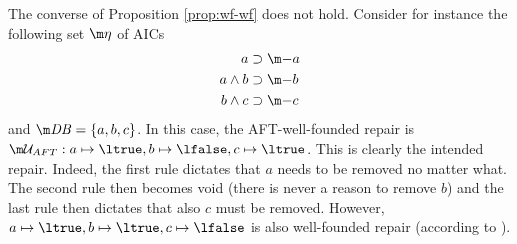 \begin{example}The converse of Proposition \ref{prop:wf-wf} does
not hold. Consider for instance the following set $\aics$ of AICs
   \begin{align*}
  a &\aicrule \remove a\\
  a\land b &\aicrule \remove b\\
  b \land c &\aicrule \remove  c
 \end{align*}
 and $\db=\{a,b,c\}$.
 In this case, the AFT-well-founded repair is $\UU_{AFT}: a \mapsto \ltrue, b\mapsto \lfalse, c\mapsto \ltrue$. This is clearly the intended repair. Indeed, the first rule dictates that $a$ needs to be removed no matter what. The second rule then becomes void (there is never a reason to remove $b$) and the last rule then dictates that also $c$ must be removed. 
 However, $a \mapsto \ltrue, b\mapsto \ltrue, c\mapsto \lfalse$ is also well-founded repair (according to \citet{}). 
\end{example}

% 
% 

